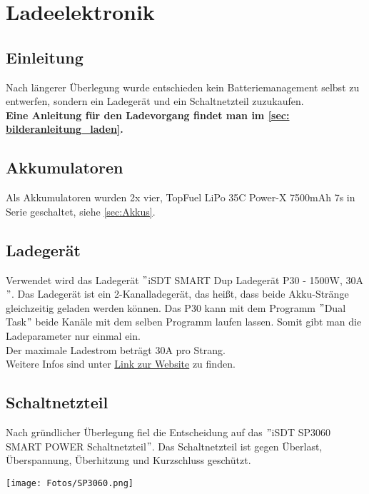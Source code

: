 \section{Ladeelektronik}
\subsection{Einleitung}
Nach längerer Überlegung wurde entschieden kein Batteriemanagement selbst zu entwerfen, sondern ein Ladegerät und ein Schaltnetzteil zuzukaufen. \\

\textbf{Eine Anleitung für den Ladevorgang findet man im \autoref{sec: bilderanleitung_laden}.}

\subsection{Akkumulatoren}
Als Akkumulatoren wurden 2x vier, TopFuel LiPo 35C Power-X 7500mAh 7s in Serie geschaltet, siehe \autoref{sec:Akkus}. \\

\subsection{Ladegerät}
Verwendet wird das Ladegerät $"$iSDT SMART Dup Ladegerät P30 - 1500W, 30A$"$. Das Ladegerät ist ein 2-Kanalladegerät, das heißt, 
dass beide Akku-Stränge gleichzeitig geladen werden können. 
Das P30 kann mit dem Programm $"$Dual Task$"$ beide Kanäle mit dem selben Programm laufen lassen. Somit gibt man die Ladeparameter nur einmal ein. \\
Der maximale Ladestrom beträgt 30$\mathrm{A}$ pro Strang. \\
Weitere Infos sind unter \href{https://www.modell-hubschrauber.at/Ladegeraete-Netzteile-Ladekabel-und-Zubehoer/Ladegeraete/Ladegeraete-12Volt/iSDT-SMART-Dup-Ladegeraet-P30-1500W-30A-8S-Lipo::43075.html}{Link zur Website} 
zu finden. 

\subsection{Schaltnetzteil}
Nach gründlicher Überlegung fiel die Entscheidung auf das $"$iSDT SP3060 SMART POWER Schaltnetzteil$"$.
Das Schaltnetzteil ist gegen Überlast, Überspannung, Überhitzung und Kurzschluss geschützt. 

\begin{minipage}{13cm}
    \centering
    \texttt{[image: Fotos/SP3060.png]}
\end{minipage}

\newpage

